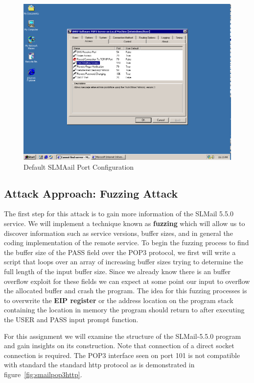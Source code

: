 \documentclass[12pt]{article}
\begin{document}
\begin{figure}[ht]
    \centering
    \includegraphics[width=5.5in]{images/20160407_slmail_config.png}
    \caption{Default SLMAail Port Configuration}
    \label{fig:deafconfigslmail}
\end{figure}

\subsection{Attack Approach: Fuzzing Attack}
\label{sec:approachpassbuff}

The first step for this attack is to gain more information of the
SLMail 5.5.0 service. We will implement a technique known as \textbf{fuzzing}
which will allow us to discover information such as service versions, 
buffer sizes, and in general the coding implementation of the remote
service. To begin the fuzzing process to find the buffer size of the PASS
field over the POP3 protocol, we first will write a script that loops over
an array of increasing buffer sizes trying to determine the full length of
the input buffer size. Since we already know there is an buffer overflow 
exploit for these fields we can expect at some point our input to overflow 
the allocated buffer and crash the program. The idea for this fuzzing 
processes is to overwrite the \textbf{EIP register} or the address location 
on the program stack containing the location in memory the program should 
return to after executing the USER and PASS input prompt function.

For this assignment we will examine the structure of the SLMail-5.5.0 
program and gain insights on its construction. Note that connection of
a direct socket connection is required. The POP3 interface seen on port 101
is not compatible with standard the standard http protocol as is 
demonstrated in figure~\ref{fig:smailpop3http}.
\end{document}
